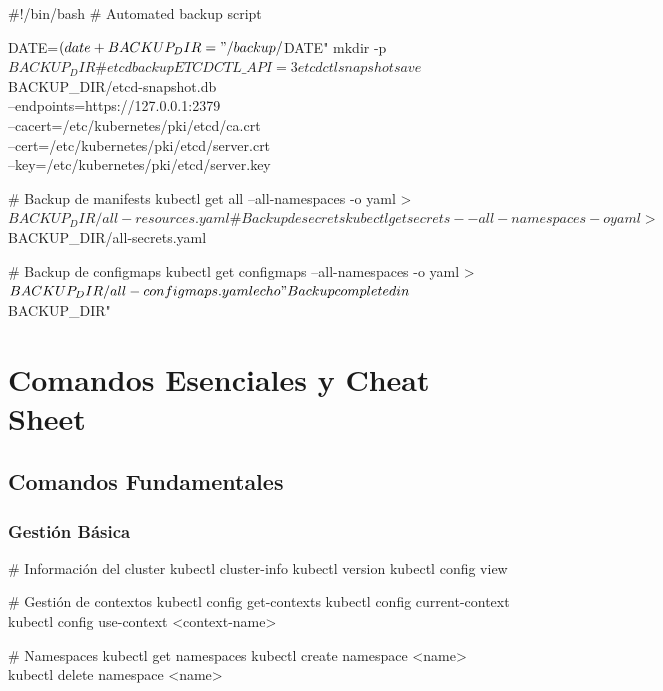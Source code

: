 \documentclass[11pt,a4paper]{article}
\begin{document}
\begin{commandbox}
\#!/bin/bash
\# Automated backup script

DATE=$(date +%
BACKUP_DIR="/backup/$DATE"
mkdir -p $BACKUP_DIR

\# etcd backup
ETCDCTL\_API=3 etcdctl snapshot save $BACKUP_DIR/etcd-snapshot.db \\
  --endpoints=https://127.0.0.1:2379 \\
  --cacert=/etc/kubernetes/pki/etcd/ca.crt \\
  --cert=/etc/kubernetes/pki/etcd/server.crt \\
  --key=/etc/kubernetes/pki/etcd/server.key

\# Backup de manifests
kubectl get all --all-namespaces -o yaml > $BACKUP_DIR/all-resources.yaml

\# Backup de secrets
kubectl get secrets --all-namespaces -o yaml > $BACKUP_DIR/all-secrets.yaml

\# Backup de configmaps
kubectl get configmaps --all-namespaces -o yaml > $BACKUP_DIR/all-configmaps.yaml

echo "Backup completed in $BACKUP_DIR"
\end{commandbox}

\newpage

\section{Comandos Esenciales y Cheat Sheet}

\subsection{Comandos Fundamentales}

\subsubsection{Gestión Básica}

\begin{commandbox}
\# Información del cluster
kubectl cluster-info
kubectl version
kubectl config view

\# Gestión de contextos
kubectl config get-contexts
kubectl config current-context
kubectl config use-context <context-name>

\# Namespaces
kubectl get namespaces
kubectl create namespace <name>
kubectl delete namespace <name>
\end{commandbox}
\end{document}
